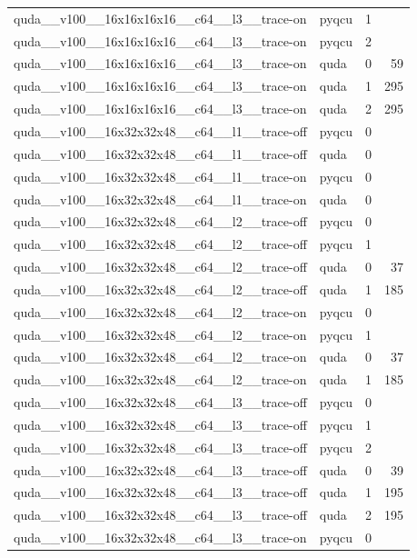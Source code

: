 \begin{table}[htbp]
\begin{tabular}{@{}llrr@{}}
quda\_\_v100\_\_16x16x16x16\_\_c64\_\_l3\_\_trace-on & pyqcu & 1 &  \\
quda\_\_v100\_\_16x16x16x16\_\_c64\_\_l3\_\_trace-on & pyqcu & 2 &  \\
quda\_\_v100\_\_16x16x16x16\_\_c64\_\_l3\_\_trace-on & quda & 0 & 59 \\
quda\_\_v100\_\_16x16x16x16\_\_c64\_\_l3\_\_trace-on & quda & 1 & 295 \\
quda\_\_v100\_\_16x16x16x16\_\_c64\_\_l3\_\_trace-on & quda & 2 & 295 \\
quda\_\_v100\_\_16x32x32x48\_\_c64\_\_l1\_\_trace-off & pyqcu & 0 &  \\
quda\_\_v100\_\_16x32x32x48\_\_c64\_\_l1\_\_trace-off & quda & 0 &  \\
quda\_\_v100\_\_16x32x32x48\_\_c64\_\_l1\_\_trace-on & pyqcu & 0 &  \\
quda\_\_v100\_\_16x32x32x48\_\_c64\_\_l1\_\_trace-on & quda & 0 &  \\
quda\_\_v100\_\_16x32x32x48\_\_c64\_\_l2\_\_trace-off & pyqcu & 0 &  \\
quda\_\_v100\_\_16x32x32x48\_\_c64\_\_l2\_\_trace-off & pyqcu & 1 &  \\
quda\_\_v100\_\_16x32x32x48\_\_c64\_\_l2\_\_trace-off & quda & 0 & 37 \\
quda\_\_v100\_\_16x32x32x48\_\_c64\_\_l2\_\_trace-off & quda & 1 & 185 \\
quda\_\_v100\_\_16x32x32x48\_\_c64\_\_l2\_\_trace-on & pyqcu & 0 &  \\
quda\_\_v100\_\_16x32x32x48\_\_c64\_\_l2\_\_trace-on & pyqcu & 1 &  \\
quda\_\_v100\_\_16x32x32x48\_\_c64\_\_l2\_\_trace-on & quda & 0 & 37 \\
quda\_\_v100\_\_16x32x32x48\_\_c64\_\_l2\_\_trace-on & quda & 1 & 185 \\
quda\_\_v100\_\_16x32x32x48\_\_c64\_\_l3\_\_trace-off & pyqcu & 0 &  \\
quda\_\_v100\_\_16x32x32x48\_\_c64\_\_l3\_\_trace-off & pyqcu & 1 &  \\
quda\_\_v100\_\_16x32x32x48\_\_c64\_\_l3\_\_trace-off & pyqcu & 2 &  \\
quda\_\_v100\_\_16x32x32x48\_\_c64\_\_l3\_\_trace-off & quda & 0 & 39 \\
quda\_\_v100\_\_16x32x32x48\_\_c64\_\_l3\_\_trace-off & quda & 1 & 195 \\
quda\_\_v100\_\_16x32x32x48\_\_c64\_\_l3\_\_trace-off & quda & 2 & 195 \\
quda\_\_v100\_\_16x32x32x48\_\_c64\_\_l3\_\_trace-on & pyqcu & 0 &  \\

\end{tabular}
\end{table}
